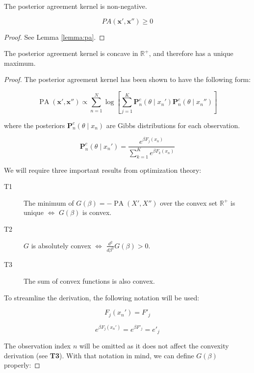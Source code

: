 \begin{theorem}
    The posterior agreement kernel is non-negative.

    $$
    PA(\bm{x}', \bm{x}'') \geq 0
    $$  
\end{theorem}

\begin{proof}
    See Lemma \ref{lemma:pa}.
\end{proof}

\begin{theorem}
    The posterior agreement kernel is concave in $\mathbb{R}^+$, and therefore
    has a unique maximum.
\end{theorem}

\begin{proof}

The posterior agreement kernel has been shown to have the following form:

$$
\operatorname{PA}\left(\bm{x}', \bm{x}'' \right) \propto \sum_{n=1}^N \log \left[ \sum_{j=1}^K \mathbf{P}_n^c(\theta \mid x_n') \mathbf{P}_n^c(\theta \mid x_n'') \right]
$$

where the posteriors $\mathbf{P}_n^c(\theta \mid x_n)$ are Gibbs distributions for each observation.

$$
\mathbf{P}_n^c(\theta \mid x_n') = \frac{e^{\beta F_j(x_n)}}{\sum_{k=1}^K e^{\beta F_k(x_n)}}
$$

We will require three important results from optimization theory:

\begin{description}
    \item[T1] The minimum of $G(\beta) = -\operatorname{PA}(X', X'')$ over the convex set $\mathbb{R}^+$ is unique $\iff$ $G(\beta)$ is convex.
    \item[T2] $G$ is absolutely convex $\iff$ $\frac{d^2}{d \beta^2} G(\beta) > 0$.
    \item[T3] The sum of convex functions is also convex.
\end{description}


To streamline the derivation, the following notation will be used:

$$
F_j(x_n') = F'_j
$$

$$
e^{\beta F_j(x_n')} = e^{\beta F'_j} = e'_j
$$

The observation index $n$ will be omitted as it does not affect the convexity derivation (see \textbf{T3}). With that notation in mind, we can define $G(\beta)$ properly:


\end{proof}
